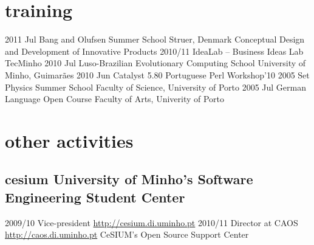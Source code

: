 \documentclass[a4paper]{friggeri-cv}
\begin{document}
\section{training}
\begin{entrylist}
    \entry
        {2011 {\footnotesize Jul}}
        {Bang and Olufsen Summer School}
        {Struer, Denmark}
        {Conceptual Design and Development of Innovative Products}
    \entry
        {2010/11}
        {IdeaLab -- Business Ideas Lab}
        {TecMinho}
        {\vspace{-0.8cm}}
    \entry
        {2010 {\footnotesize Jul}}
        {Luso-Brazilian Evolutionary Computing School}
        {University of Minho, Guimarães}
        {\vspace{-0.8cm}}
    \entry
        {2010 {\footnotesize Jun}}
        {Catalyst 5.80}
        {Portuguese Perl Workshop'10}
        {\vspace{-0.8cm}}
    \entry
        {2005 {\footnotesize Set}}
        {Physics Summer School}
        {Faculty of Science, University of Porto}
        {\vspace{-0.8cm}}
    \entry
        {2005 {\footnotesize Jul}}
        {German Language Open Course}
        {Faculty of Arts, Univerity of Porto}
        {\vspace{-0.8cm}}
\end{entrylist}


\section{other activities}
\subsection{cesium {\normalfont\small University of Minho's Software Engineering Student Center}}{}
\begin{entrylist}
  \entry
    {2009/10}
    {Vice-president}
    {\href{http://cesium.di.uminho.pt}{http://cesium.di.uminho.pt}}
    {\vspace{-.8cm}}
  \entry
    {2010/11}
    {Director at CAOS}
    {\href{http://caos.di.uminho.pt}{http://caos.di.uminho.pt}}
    {CeSIUM's Open Source Support Center}
\end{entrylist}
\end{document}
